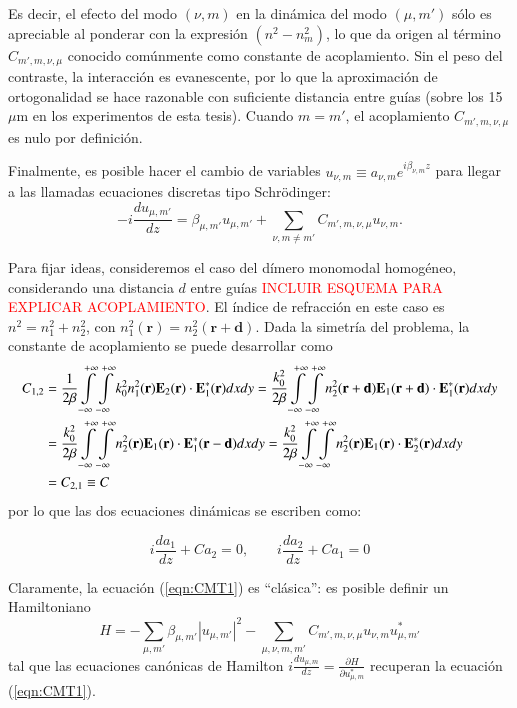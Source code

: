 Es decir, el efecto del modo $(\nu, m)$ en la dinámica del modo $(\mu, m')$ sólo es apreciable al ponderar con la expresión $(n^2 - n^2_{m})$, lo que da origen al término $C_{m', m, \nu, \mu}$ conocido comúnmente como constante de acoplamiento. Sin el peso del contraste, la interacción es evanescente, por lo que la aproximación de ortogonalidad se hace razonable con suficiente distancia entre guías (sobre los 15 $\mu$m en los experimentos de esta tesis). Cuando $m=m'$, el acoplamiento $C_{m', m, \nu, \mu}$ es nulo por definición.

Finalmente, es posible hacer el cambio de variables $u_{\nu, m} \equiv a_{\nu, m} e^{i\beta_{\nu, m} z}$ para llegar a las llamadas ecuaciones discretas tipo Schrödinger:
\begin{equation}
	  	 -i\frac{d u_{\mu, m'}}{dz} = \beta_{\mu, m'} u_{\mu, m'} + \sum_{\nu, m\neq m'}C_{m', m, \nu, \mu}   u_{\nu, m}.
	\label{eqn:CMT1}
\end{equation}



Para fijar ideas, consideremos el caso del dímero monomodal homogéneo, considerando una distancia $d$ entre guías \textcolor{red}{INCLUIR ESQUEMA PARA EXPLICAR ACOPLAMIENTO}. El índice de refracción en este caso es $n^2 = n_1^2 + n_2^2$, con $n_1^2(\textbf{r})=n_2^2(\textbf{r}+\textbf{d})$. Dada la simetría del problema, la constante de acoplamiento se puede desarrollar como 
\begin{align}
	C_{1, 2} &=  \frac{1}{2\beta}\int\displaylimits_{-\infty}^{+\infty}\int\displaylimits_{-\infty}^{+\infty} k_0^2 n_1^2(\textbf{r}) \textbf{E}_{2}(\textbf{r}) \cdot \textbf{E}_{1}^*(\textbf{r}) dxdy 
	= \frac{k_0^2}{2\beta}\int\displaylimits_{-\infty}^{+\infty}\int\displaylimits_{-\infty}^{+\infty}  n_2^2(\textbf{r}+\textbf{d}) \textbf{E}_{1}(\textbf{r}+\textbf{d}) \cdot \textbf{E}_{1}^*(\textbf{r}) dxdy 
	\nonumber	
	\\	
	&= \frac{k_0^2}{2\beta}\int\displaylimits_{-\infty}^{+\infty}\int\displaylimits_{-\infty}^{+\infty} n_2^2(\textbf{r}) \textbf{E}_{1}(\textbf{r}) \cdot \textbf{E}_{1}^*(\textbf{r}-\textbf{d}) dxdy 
	= \frac{k_0^2}{2\beta}\int\displaylimits_{-\infty}^{+\infty}\int\displaylimits_{-\infty}^{+\infty} n_2^2(\textbf{r}) \textbf{E}_{1}(\textbf{r}) \cdot \textbf{E}_{2}^*(\textbf{r}) dxdy 
	\nonumber
	\\	
	&= C_{2,1} \equiv C
	\nonumber
\end{align}
 por lo que las dos ecuaciones dinámicas se escriben como:

\begin{equation}
	i\frac{d a_1}{dz} + C a_2 = 0, \quad\quad i\frac{d a_2}{dz} + C a_1 = 0 \nonumber
\end{equation}

Claramente, la ecuación (\ref{eqn:CMT1}) es ``clásica'': es posible definir un Hamiltoniano 
\begin{equation}
	H = -\sum_{\mu, m'} \beta_{\mu, m'} |u_{\mu, m'}|^2 - \sum_{\mu, \nu, m, m'}C_{m', m, \nu, \mu}   u_{\nu, m}u^*_{\mu, m'}
\end{equation}
tal que las ecuaciones canónicas de Hamilton $i\frac{d u_{\mu, m}}{dz} = \frac{\partial H}{\partial u^*_{\mu, m}} $ recuperan la ecuación (\ref{eqn:CMT1}).

	
